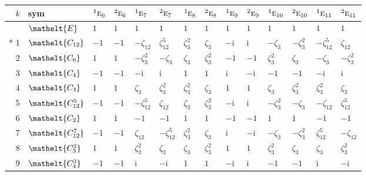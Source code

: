 \documentclass[10pt,a4paper]{article}
\numberwithin{equation}{section}
\newcommand{\eltfont}[1]{{\let\sigma\eltsigma\mathelt{#1}}}
\newcommand{\irr}[1]{\text{\normalfont\scshape #1}}
\newcommand{\conjpair}[1]{{}^{#1}}
\newcommand{\cls}[1]{\eltfont{#1}}
\newcommand{\iunit}{\mathrm{i}}
\newcommand{\rootunity}[1]{\zeta_{#1}}
\begin{document}
{\small\setlength{\tabcolsep}{4pt}
\begin{longtable}{@{}rlllllllllllll@{}}\toprule
$k$ & sym & $\conjpair{1}\irr{e}_{6}$ & $\conjpair{2}\irr{e}_{6}$ & $\conjpair{1}\irr{e}_{7}$ & $\conjpair{2}\irr{e}_{7}$ & $\conjpair{1}\irr{e}_{8}$ & $\conjpair{2}\irr{e}_{8}$ & $\conjpair{1}\irr{e}_{9}$ & $\conjpair{2}\irr{e}_{9}$ & $\conjpair{1}\irr{e}_{10}$ & $\conjpair{2}\irr{e}_{10}$ & $\conjpair{1}\irr{e}_{11}$ & $\conjpair{2}\irr{e}_{11}$\\\midrule\endhead
\bottomrule\endfoot\endlastfoot
0 & $\cls{E}$ & $1$ & $1$ & $1$ & $1$ & $1$ & $1$ & $1$ & $1$ & $1$ & $1$ & $1$ & $1$\\*
1 & $\cls{C_{12}}$ & $-1$ & $-1$ & $-\rootunity{12}$ & $\rootunity{12}^{5}$ & $\rootunity{3}^{2}$ & $\rootunity{3}$ & $-\iunit{}$ & $\iunit{}$ & $-\rootunity{3}$ & $-\rootunity{3}^{2}$ & $-\rootunity{12}^{5}$ & $\rootunity{12}$\\
2 & $\cls{C_{6}}$ & $1$ & $1$ & $-\rootunity{3}^{2}$ & $-\rootunity{3}$ & $\rootunity{3}$ & $\rootunity{3}^{2}$ & $-1$ & $-1$ & $\rootunity{3}^{2}$ & $\rootunity{3}$ & $-\rootunity{3}$ & $-\rootunity{3}^{2}$\\
3 & $\cls{C_{4}}$ & $-1$ & $-1$ & $-\iunit{}$ & $\iunit{}$ & $1$ & $1$ & $\iunit{}$ & $-\iunit{}$ & $-1$ & $-1$ & $-\iunit{}$ & $\iunit{}$\\
4 & $\cls{C_{3}}$ & $1$ & $1$ & $\rootunity{3}$ & $\rootunity{3}^{2}$ & $\rootunity{3}^{2}$ & $\rootunity{3}$ & $1$ & $1$ & $\rootunity{3}$ & $\rootunity{3}^{2}$ & $\rootunity{3}^{2}$ & $\rootunity{3}$\\
5 & $\cls{C_{12}^{5}}$ & $-1$ & $-1$ & $-\rootunity{12}^{5}$ & $\rootunity{12}$ & $\rootunity{3}$ & $\rootunity{3}^{2}$ & $-\iunit{}$ & $\iunit{}$ & $-\rootunity{3}^{2}$ & $-\rootunity{3}$ & $-\rootunity{12}$ & $\rootunity{12}^{5}$\\
6 & $\cls{C_{2}}$ & $1$ & $1$ & $-1$ & $-1$ & $1$ & $1$ & $-1$ & $-1$ & $1$ & $1$ & $-1$ & $-1$\\
7 & $\cls{C_{12}^{7}}$ & $-1$ & $-1$ & $\rootunity{12}$ & $-\rootunity{12}^{5}$ & $\rootunity{3}^{2}$ & $\rootunity{3}$ & $\iunit{}$ & $-\iunit{}$ & $-\rootunity{3}$ & $-\rootunity{3}^{2}$ & $\rootunity{12}^{5}$ & $-\rootunity{12}$\\
8 & $\cls{C_{3}^{2}}$ & $1$ & $1$ & $\rootunity{3}^{2}$ & $\rootunity{3}$ & $\rootunity{3}$ & $\rootunity{3}^{2}$ & $1$ & $1$ & $\rootunity{3}^{2}$ & $\rootunity{3}$ & $\rootunity{3}$ & $\rootunity{3}^{2}$\\
9 & $\cls{C_{4}^{3}}$ & $-1$ & $-1$ & $\iunit{}$ & $-\iunit{}$ & $1$ & $1$ & $-\iunit{}$ & $\iunit{}$ & $-1$ & $-1$ & $\iunit{}$ & $-\iunit{}$\\

\end{longtable}}
\end{document}
